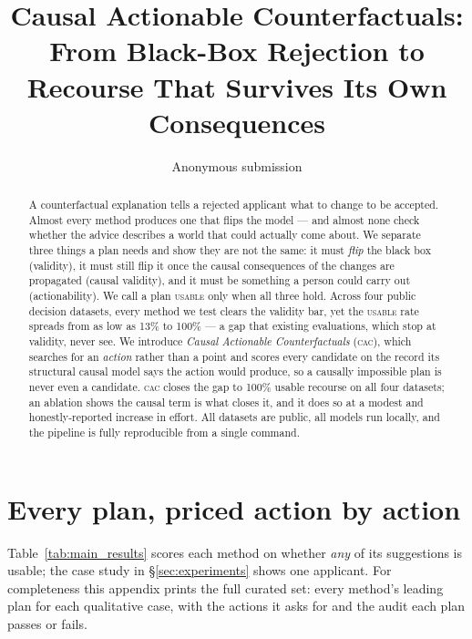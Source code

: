 \documentclass[11pt]{article}
\title{\bfseries Causal Actionable Counterfactuals:\\[2pt]
  \large From Black-Box Rejection to Recourse That Survives Its Own Consequences}
\author{Anonymous submission}
\date{}
\newcommand{\Usable}{\textsc{usable}}
\newcommand{\cac}{\textsc{cac}}
\begin{document}
\maketitle

\begin{abstract}
A counterfactual explanation tells a rejected applicant what to change to be
accepted. Almost every method produces one that flips the model --- and almost
none check whether the advice describes a world that could actually come about.
We separate three things a plan needs and show they are not the same: it must
\emph{flip} the black box (validity), it must still flip it once the causal
consequences of the changes are propagated (causal validity), and it must be
something a person could carry out (actionability). We call a plan \Usable{} only
when all three hold. Across four public decision datasets, every method we test
clears the validity bar, yet the \Usable{} rate spreads from as low as
\mbox{13\%} to \mbox{100\%} --- a gap that existing evaluations, which stop at
validity, never see. We introduce \emph{Causal Actionable Counterfactuals}
(\cac), which searches for an \emph{action} rather than a point and scores every
candidate on the record its structural causal model says the action would
produce, so a causally impossible plan is never even a candidate. \cac{} closes
the gap to 100\% usable recourse on all four datasets; an ablation shows the
causal term is what closes it, and it does so at a modest and honestly-reported
increase in effort. All datasets are public, all models run locally, and the
pipeline is fully reproducible from a single command.
\end{abstract}















\appendix
\section{Every plan, priced action by action}
\label{app:plans}
Table~\ref{tab:main_results} scores each method on whether \emph{any} of its
suggestions is usable; the case study in \S\ref{sec:experiments} shows one
applicant. For completeness this appendix prints the full curated set: every
method's leading plan for each qualitative case, with the actions it asks for
and the audit each plan passes or fails.

\end{document}

